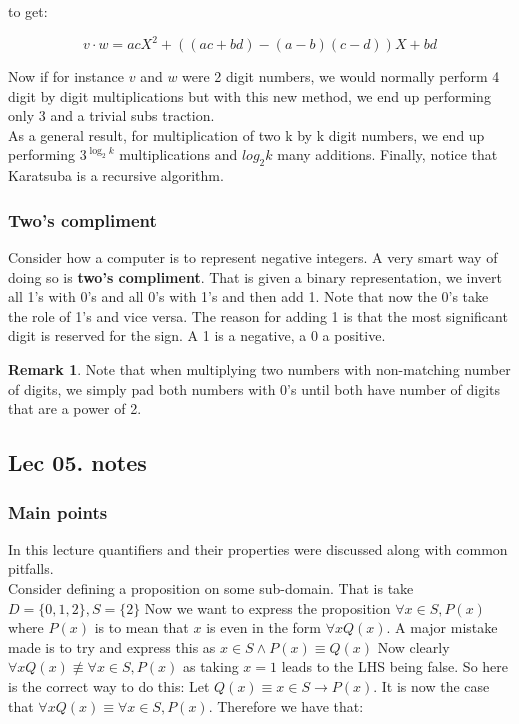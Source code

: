 \documentclass[titlepage]{article}
\theoremstyle{definition}
\newtheorem{remark}{Remark}
\numberwithin{equation}{subsection}
\numberwithin{remark}{subsection}
\begin{document}
to get:

\begin{equation*}
    v\cdot w = acX^2 + ((ac + bd) - (a - b)(c - d))X + bd
\end{equation*}

Now if for instance $v$ and $w$ were 2 digit numbers, we would normally perform 4 digit by digit multiplications but with this new method, we end up performing only 3 and a trivial subs traction. 
\\
As a general result, for multiplication of two k by k digit numbers, we end up performing $3^{\log_{2}k}$ multiplications and $log_{2}k$ many additions. Finally, notice that Karatsuba is a recursive algorithm. 
\subsubsection{Two's compliment}
Consider how a computer is to represent negative integers. A very smart way of doing so is \textbf{two's compliment}. That is given a binary representation, we invert all 1's with 0's and all 0's with 1's and then add 1. Note that now the 0's take the role of 1's and vice versa. The reason for adding 1 is that the most significant digit is reserved for the sign. A 1 is a negative, a 0 a positive.  
\\
\begin{remark}
Note that when multiplying two numbers with non-matching number of digits, we simply pad both numbers with 0's until both have number of digits that are a power of 2. 
\end{remark}

\subsection{Lec 05. notes}
\subsubsection{Main points}
In this lecture quantifiers and their properties were discussed along with common pitfalls. 
\\
Consider defining a proposition on some sub-domain. That is take $D = \{0,1,2\}, S = \{2\}$ Now we want to express the proposition $\forall x \in S, P(x)$ where $P(x)$ is to mean that $x$ is even in the form $\forall x Q(x)$. A major mistake made is to try and express this as $x \in S \land P(x) \equiv Q(x)$ Now clearly $\forall x Q(x) \not \equiv \forall x \in S, P(x) $ as taking $x=1$ leads to the LHS being false. So here is the correct way to do this: Let $Q(x) \equiv x\in S \rightarrow P(x)$. It is now the case that $\forall x Q(x) \equiv \forall x \in S, P(x)$. Therefore we have that:
\end{document}
